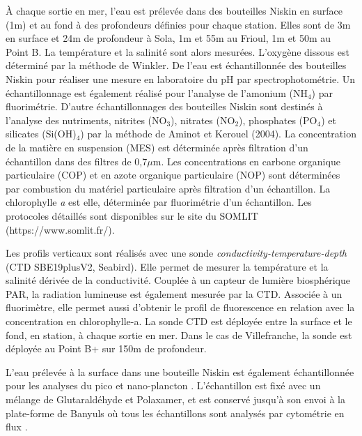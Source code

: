 \documentclass[12pt]{article}
\begin{document}
À chaque sortie en mer, l’eau est prélevée dans des bouteilles Niskin en surface (1m) et au fond à des profondeurs définies pour chaque station. Elles sont de 3m en surface et 24m de profondeur à Sola, 1m et 55m au Frioul, 1m et 50m au Point B. La température et la salinité sont alors mesurées. L’oxygène dissous est déterminé par la méthode de Winkler. De l’eau est échantillonnée des bouteilles Niskin pour réaliser une mesure en laboratoire du pH par spectrophotométrie. Un échantillonnage est également réalisé pour l’analyse de l’amonium (NH$_4$) par fluorimétrie. D’autre échantillonnages des bouteilles Niskin sont destinés à l’analyse des nutriments, nitrites (NO$_3$), nitrates (NO$_2$), phosphates (PO$_4$) et silicates (Si(OH)$_4$) par la méthode de Aminot et Kerouel (2004). La concentration de la matière en suspension (MES) est déterminée après filtration d’un échantillon dans des filtres de 0,7$\mu$m. Les concentrations en carbone organique particulaire (COP) et en azote organique particulaire (NOP) sont déterminées par combustion du matériel particulaire après filtration d’un échantillon. La chlorophylle \textit{a} est elle, déterminée par fluorimétrie d’un échantillon. Les protocoles détaillés sont disponibles sur le site du SOMLIT (https://www.somlit.fr/). 


Les profils verticaux sont réalisés avec une sonde \textit{conductivity-temperature-depth} (CTD SBE19plusV2, Seabird).  Elle permet de mesurer la température et la salinité dérivée de la conductivité. Couplée à un capteur de lumière biosphérique PAR, la radiation lumineuse est également mesurée par la CTD. Associée à un fluorimètre, elle permet aussi d’obtenir le profil de fluorescence en relation avec la concentration en chlorophylle-a. La sonde CTD est déployée entre la surface et le fond, en station, à chaque sortie en mer. Dans le cas de Villefranche, la sonde est déployée au Point B+ sur 150m de profondeur. 


L’eau prélevée à la surface dans une bouteille Niskin est également échantillonnée pour les analyses du pico et nano-plancton \citep{Marie2014} . L’échantillon est fixé avec un mélange de Glutaraldéhyde et Polaxamer, et est conservé jusqu’à son envoi à la plate-forme de Banyuls où tous les échantillons sont analysés par cytométrie en flux \citep{Marie2014}.
\end{document}
